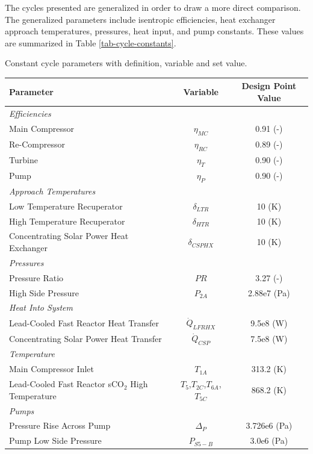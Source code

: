 \begin{paracol}{2}
The cycles presented are generalized in order to draw a more direct comparison. The generalized parameters include isentropic efficiencies, heat exchanger approach temperatures, pressures, heat input, and pump constants. These values are summarized in Table \ref{tab-cycle-constants}.


\begin{specialtable}[H] 
    \caption{Constant cycle parameters with definition, variable and set value. \label{tab-cycle-constants}}
    \begin{tabular}{lcc}
    \toprule
    \textbf{Parameter} & \textbf{Variable}	& \textbf{Design Point Value}\\
    \midrule
    \textit{Efficiencies}\\
    Main Compressor & $\eta_{MC}$		& 0.91 (-)\\
    Re-Compressor & $\eta_{RC}$		& 0.89 (-)\\
    Turbine & $\eta_{T}$		& 0.90 (-)\\
    Pump & $\eta_{P}$      & 0.90 (-)\\
    \midrule
    \textit{Approach Temperatures}\\
    Low Temperature Recuperator & $\delta_{LTR}$		& 10 (K)\\
    High Temperature Recuperator & $\delta_{HTR}$		& 10 (K)\\
    Concentrating Solar Power Heat Exchanger & $\delta_{CSPHX}$	& 10 (K)\\
    \midrule
    \textit{Pressures}\\
    Pressure Ratio & $PR$ & 3.27 (-)\\
    High Side Pressure & $P_{2A}$ & 2.88e7 (Pa)\\
    \midrule
    \textit{Heat Into System}\\
    Lead-Cooled Fast Reactor Heat Transfer & $\dot{Q}_{LFRHX}$ & 9.5e8 (W)\\
    Concentrating Solar Power Heat Transfer & $\dot{Q}_{CSP}$ & 7.5e8 (W)\\
    \midrule
    \textit{Temperature}\\
    Main Compressor Inlet & $T_{1A}$ & 313.2 (K)\\
    Lead-Cooled Fast Reactor sCO$_{2}$ High Temperature & $T_{5}$,$T_{2C}$,$T_{6A}$,$T_{5C}$ & 868.2 (K)\\
    \midrule
    \textit{Pumps}\\
    Pressure Rise Across Pump & $\Delta_{P}$ & 3.726e6 (Pa)\\
    Pump Low Side Pressure & $P_{S5-B}$ & 3.0e6 (Pa)\\ 
    \bottomrule
    \end{tabular}
\end{specialtable}


\end{paracol}
